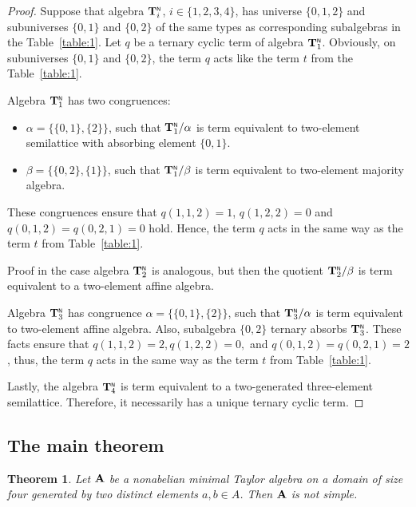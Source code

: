 \documentclass[11pt]{amsart}
\newcommand{\m}[1]{\mathbf{\uppercase{#1}}}
\newcommand{\n}{\scriptscriptstyle{\mathsf{N}}}
\newtheorem{thm}{Theorem}
\theoremstyle{definition}
\theoremstyle{remark}
\theoremstyle{plain}
\begin{document}
\begin{proof} Suppose that algebra ${\m T}_i^{\n}$, $i\in \{1,2,3,4\}$, has universe $\{0,1,2\}$ and subuniverses $\{0,1\}$ and $\{0,2\}$ of the same types as corresponding subalgebras in the Table~\ref{table:1}. Let $q$ be a ternary cyclic term of algebra ${\m T}_1^{\n}$. Obviously, on subuniverses $\{0,1\}$ and $\{0,2\}$, the term $q$ acts like the term $t$ from the Table~\ref{table:1}.

Algebra ${\m T}_1^{\n}$ has two congruences:
\begin{itemize}
\item $\alpha=\{\{0,1\},\{2\}\}$, such that ${\m T}_1^{\n}/\alpha$ is term equivalent to two-element semilattice with absorbing element $\{0,1\}$.
\item $\beta=\{\{0,2\},\{1\}\}$, such that ${\m T}_1^{\n}/\beta$ is term equivalent to two-element majority algebra.
\end{itemize}
These congruences ensure that $q(1,1,2)=1$, $q(1,2,2)=0$ and $q(0,1,2)=q(0,2,1)=0$ hold. Hence, the term $q$ acts in the same way as the term $t$ from Table~\ref{table:1}.

Proof in the case algebra ${\m T}_2^{\n}$ is analogous, but then the quotient ${\m T}_2^{\n} /\beta$ is term equivalent to a two-element affine algebra.

Algebra ${\m T}_3^{\n}$ has congruence $\alpha=\{\{0,1\},\{2\}\}$, such that ${\m T}_3^{\n}/\alpha$ is term equivalent to two-element affine algebra. Also, subalgebra $\{0,2\}$ ternary absorbs ${\m T}_3^{\n}$. These facts ensure that $q(1,1,2)=2, q(1,2,2)=0,$ and $q(0,1,2)=q(0,2,1)=2$, thus, the term $q$ acts in the same way as the term $t$ from Table~\ref{table:1}.

Lastly, the algebra ${\m T}_4^{\n}$ is term equivalent to a two-generated three-element semilattice. Therefore, it necessarily has a unique ternary cyclic term.
\end{proof}


\subsection{The main theorem}
\begin{thm}\label{main-factor}
Let ${\m A}$ be a nonabelian minimal Taylor algebra on a domain of size four generated by two distinct elements $a,b\in A$. Then $\m a$ is not simple.
\end{thm}
\end{document}
